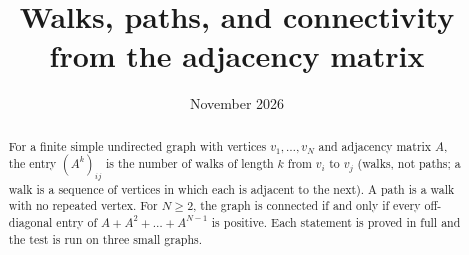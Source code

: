 \documentclass[11pt,a4paper]{article}
\title{Walks, paths, and connectivity from the adjacency matrix}
\author{}
\date{November 2026}
\theoremstyle{definition}
\theoremstyle{plain}
\theoremstyle{remark}
\begin{document}
\maketitle

\begin{abstract}
For a finite simple undirected graph with vertices $v_1,\dots,v_N$ and adjacency matrix $A$, the entry $(A^k)_{ij}$ is the number of walks of length $k$ from $v_i$ to $v_j$ (walks, not paths; a walk is a sequence of vertices in which each is adjacent to the next). A path is a walk with no repeated vertex. For $N\ge2$, the graph is connected if and only if every off-diagonal entry of $A+A^2+\dots+A^{N-1}$ is positive. Each statement is proved in full and the test is run on three small graphs.
\end{abstract}







\printbibliography
\end{document}
